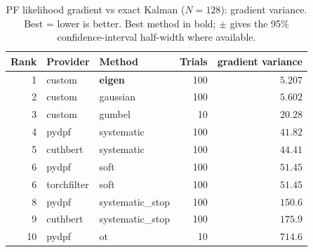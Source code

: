\begin{table}[!htbp]
\centering
\small
\caption{PF likelihood gradient vs exact Kalman ($N=128$): gradient variance. Best = lower is better. Best method in bold; $\pm$ gives the 95\% confidence-interval half-width where available.}
\label{tab:pf-likelihood-gradient-vs-exact-kalman-gradient-variance}
\begin{tabular}{rllrr}
\toprule
Rank & Provider & Method & Trials & gradient variance \\
\midrule
1 & custom & \textbf{eigen} & 100 & $\mathbf{5.207}$ \\
2 & custom & gaussian & 100 & $5.602$ \\
3 & custom & gumbel & 10 & $20.28$ \\
4 & pydpf & systematic & 100 & $41.82$ \\
5 & cuthbert & systematic & 100 & $44.41$ \\
6 & pydpf & soft & 100 & $51.45$ \\
6 & torchfilter & soft & 100 & $51.45$ \\
8 & pydpf & systematic\_stop & 100 & $150.6$ \\
9 & cuthbert & systematic\_stop & 100 & $175.9$ \\
10 & pydpf & ot & 10 & $714.6$ \\
\bottomrule
\end{tabular}
\end{table}
